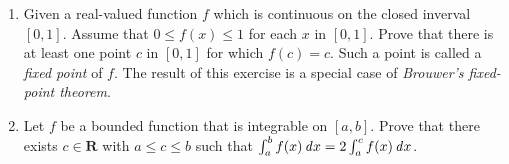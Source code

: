 \documentclass[a4paper]{article}
\begin{document}
\begin{enumerate}
\item Given a real-valued function \(f\) which is continuous on the closed
  inverval \([0,1]\).  Assume that \(0 \le f(x) \le 1\) for each \(x\) in
  \([0,1]\).  Prove that there is at least one point \(c\) in \([0,1]\)
  for which \(f(c) = c\).  Such a point is called a \emph{fixed point} of
  \(f\).  The result of this exercise is a special case of \emph{Brouwer's
    fixed-point theorem}.

\item[\bonus] Let \(f\) be a bounded function that is integrable on
  \([a,b]\).  Prove that there exists \(c \in \mathbf{R}\) with
  \(a \le c \le b\) such that \(\int_a^b f(x) \mathop{}\!\mathit{d} x = 2 \int_a^c f(x) \mathop{}\!\mathit{d} x\).
\end{enumerate}
\end{document}
